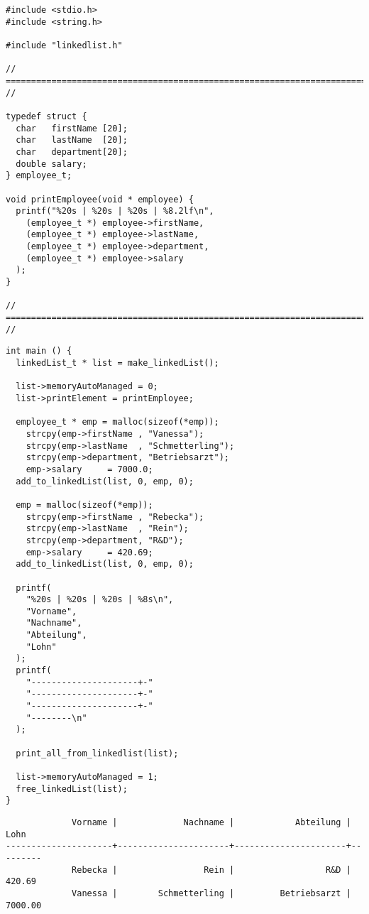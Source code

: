 \begin{codebox}
\begin{verbatim}
#include <stdio.h>
#include <string.h>

#include "linkedlist.h"

// ========================================================================= //

typedef struct {
  char   firstName [20];
  char   lastName  [20];
  char   department[20];
  double salary;
} employee_t;

void printEmployee(void * employee) {
  printf("%20s | %20s | %20s | %8.2lf\n",
    (employee_t *) employee->firstName,
    (employee_t *) employee->lastName,
    (employee_t *) employee->department,
    (employee_t *) employee->salary
  );
}

// ========================================================================= //
\end{verbatim}
\end{codebox}
%
\begin{codebox}[]
\begin{verbatim}
int main () {
  linkedList_t * list = make_linkedList();
  
  list->memoryAutoManaged = 0;
  list->printElement = printEmployee;
  
  employee_t * emp = malloc(sizeof(*emp));
    strcpy(emp->firstName , "Vanessa");
    strcpy(emp->lastName  , "Schmetterling");
    strcpy(emp->department, "Betriebsarzt");
    emp->salary     = 7000.0;
  add_to_linkedList(list, 0, emp, 0);
  
  emp = malloc(sizeof(*emp));
    strcpy(emp->firstName , "Rebecka");
    strcpy(emp->lastName  , "Rein");
    strcpy(emp->department, "R&D");
    emp->salary     = 420.69;
  add_to_linkedList(list, 0, emp, 0);
  
  printf(
    "%20s | %20s | %20s | %8s\n",
    "Vorname",
    "Nachname",
    "Abteilung",
    "Lohn"
  );
  printf(
    "---------------------+-"
    "---------------------+-"
    "---------------------+-"
    "--------\n"
  );
  
  print_all_from_linkedlist(list);
  
  list->memoryAutoManaged = 1;
  free_linkedList(list);
}
\end{verbatim}
\end{codebox}

\begin{cmdbox}
\begin{verbatim}
             Vorname |             Nachname |            Abteilung |     Lohn
---------------------+----------------------+----------------------+---------
             Rebecka |                 Rein |                  R&D |   420.69
             Vanessa |        Schmetterling |         Betriebsarzt |  7000.00
\end{verbatim}
\end{cmdbox}


